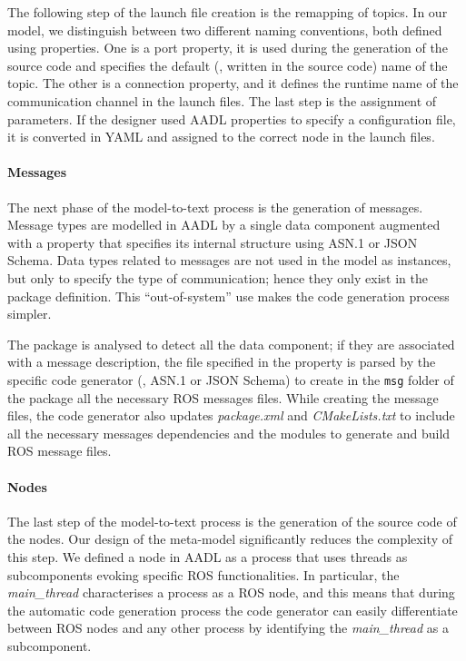 The following step of the launch file creation is the remapping of topics. In our model, we distinguish between two different naming conventions, both defined using properties. One is a port property, it is used during the generation of the source code and specifies the default (\ie, written in the source code) name of the topic. The other is a connection property, and it defines the runtime name of the communication channel in the launch files. The last step is the assignment of parameters. If the designer used AADL properties to specify a configuration file, it is converted in YAML and assigned to the correct node in the launch files.
  
\paragraph{Messages} The next phase of the model-to-text process is the generation of messages. Message types are modelled in AADL by a single data component augmented with a property that specifies its internal structure using ASN.1 or JSON Schema. Data types related to messages are not used in the model as instances, but only to specify the type of communication; hence they only exist in the package definition. This ``out-of-system'' use makes the code generation process simpler.

The package is analysed to detect all the data component; if they are associated with a message description, the file specified in the property is parsed by the specific code generator (\ie, ASN.1 or JSON Schema) to create in the \texttt{msg} folder of the package all the necessary ROS messages files. While creating the message files, the code generator also updates \textit{package.xml} and \textit{CMakeLists.txt} to include all the necessary messages dependencies and the modules to generate and build ROS message files.

\paragraph{Nodes} The last step of the model-to-text process is the generation of the source code of the nodes. Our design of the meta-model significantly reduces the complexity of this step. We defined a node in AADL as a process that uses threads as subcomponents evoking specific ROS functionalities. In particular, the \textit{main\_thread} characterises a process as a ROS node, and this means that during the automatic code generation process the code generator can easily differentiate between ROS nodes and any other process by identifying the \textit{main\_thread} as a subcomponent.

